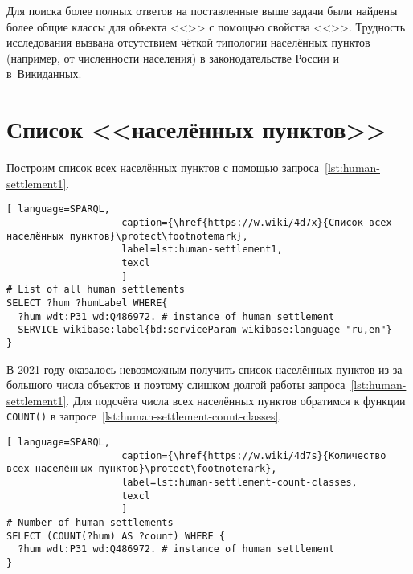 Для поиска более полных ответов на поставленные выше задачи  
были найдены более общие классы для объекта <<>> 
с помощью свойства <<>>. 
Трудность исследования вызвана отсутствием чёткой типологии населённых пунктов 
(например, от численности населения) в законодательстве России и в~Викиданных.



\section{Список <<населённых пунктов>>}

Построим список всех населённых пунктов с помощью запроса~\ref{lst:human-settlement1}.

\begin{lstlisting}[ language=SPARQL, 
                    caption={\href{https://w.wiki/4d7x}{Список всех населённых пунктов}\protect\footnotemark},
                    label=lst:human-settlement1,
                    texcl 
                    ]
# List of all human settlements
SELECT ?hum ?humLabel WHERE{
  ?hum wdt:P31 wd:Q486972. # instance of human settlement
  SERVICE wikibase:label{bd:serviceParam wikibase:language "ru,en"}
}
\end{lstlisting}%

В 2021 году оказалось невозможным получить список населённых пунктов 
из-за большого числа объектов и поэтому слишком долгой работы запроса~\ref{lst:human-settlement1}. 
Для подсчёта числа всех населённых пунктов обратимся к функции \lstinline|COUNT()| 
в запросе~\ref{lst:human-settlement-count-classes}.

\begin{lstlisting}[ language=SPARQL, 
                    caption={\href{https://w.wiki/4d7s}{Количество всех населённых пунктов}\protect\footnotemark},
                    label=lst:human-settlement-count-classes,
                    texcl 
                    ]
# Number of human settlements
SELECT (COUNT(?hum) AS ?count) WHERE {
  ?hum wdt:P31 wd:Q486972. # instance of human settlement  
}
\end{lstlisting}%

